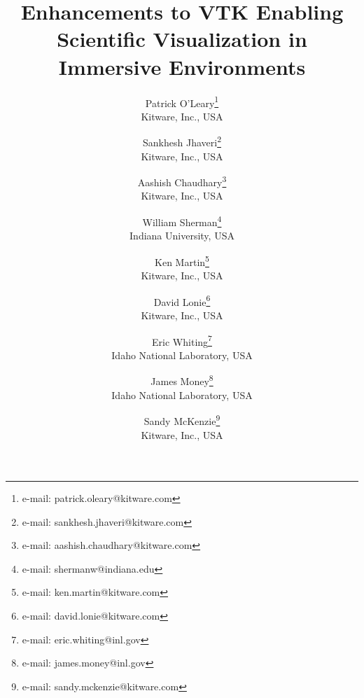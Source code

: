 \title{Enhancements to VTK Enabling\\ Scientific Visualization in Immersive Environments}

\author{Patrick O'Leary\thanks{e-mail: patrick.oleary@kitware.com}\\ %
        \scriptsize Kitware, Inc., USA%
\and Sankhesh Jhaveri\thanks{e-mail: sankhesh.jhaveri@kitware.com}\\ %
        \scriptsize Kitware, Inc., USA %
\and Aashish Chaudhary\thanks{e-mail: aashish.chaudhary@kitware.com}\\ %
        \scriptsize Kitware, Inc., USA %
\and William Sherman\thanks{e-mail: shermanw@indiana.edu}\\ %
        \scriptsize Indiana University, USA %
\and Ken Martin\thanks{e-mail: ken.martin@kitware.com}\\ %
        \scriptsize Kitware, Inc., USA %
\and David Lonie\thanks{e-mail: david.lonie@kitware.com}\\ %
        \scriptsize Kitware, Inc., USA  %
\and Eric Whiting\thanks{e-mail: eric.whiting@inl.gov}\\ %
        \scriptsize Idaho National Laboratory, USA %
\and James Money\thanks{e-mail: james.money@inl.gov}\\ %
        \scriptsize Idaho National Laboratory, USA %
\and Sandy McKenzie\thanks{e-mail: sandy.mckenzie@kitware.com}\\ %
        \scriptsize Kitware, Inc., USA %
        }

